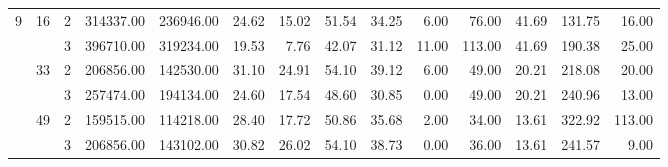 \begin{tabular}{lllrrrrrrrrrrr}
\cline{2-14}
\multirow{6}{*}{9} & \multirow{2}{*}{16} & 2 & 314337.00 & 236946.00 & 24.62 &   15.02 &   51.54 &   34.25 &    6.00 &   76.00 &   41.69 & 131.75 &    16.00 \\
  &    & 3 & 396710.00 & 319234.00 & 19.53 &    7.76 &   42.07 &   31.12 &   11.00 &  113.00 &   41.69 & 190.38 &    25.00 \\
\cline{2-14}
  & \multirow{2}{*}{33} & 2 & 206856.00 & 142530.00 & 31.10 &   24.91 &   54.10 &   39.12 &    6.00 &   49.00 &   20.21 & 218.08 &    20.00 \\
  &    & 3 & 257474.00 & 194134.00 & 24.60 &   17.54 &   48.60 &   30.85 &    0.00 &   49.00 &   20.21 & 240.96 &    13.00 \\
\cline{2-14}
  & \multirow{2}{*}{49} & 2 & 159515.00 & 114218.00 & 28.40 &   17.72 &   50.86 &   35.68 &    2.00 &   34.00 &   13.61 & 322.92 &   113.00 \\
  &    & 3 & 206856.00 & 143102.00 & 30.82 &   26.02 &   54.10 &   38.73 &    0.00 &   36.00 &   13.61 & 241.57 &     9.00 \\
\bottomrule
\end{tabular}

